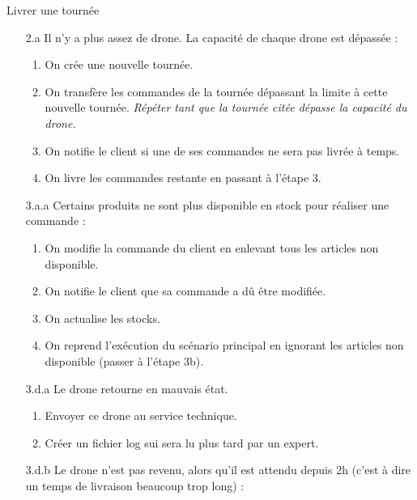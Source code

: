\begin{UseCase}{Livrer une tournée}
\begin{UseCaseExtension}
    \begin{enumerate}
        \item[2.a] Il n'y a plus assez de drone. La capacité de chaque drone
            est dépassée :
            \begin{enumerate}
                \item On crée une nouvelle tournée.
                \item On transfère les commandes de la tournée dépassant la
                    limite à cette nouvelle tournée. \textit{Répéter tant que
                        la tournée citée dépasse la capacité du drone.}
                \item On notifie le client si une de ses commandes ne sera pas
                    livrée à temps.
                \item On livre les commandes restante en passant à l'étape 3.
            \end{enumerate}
        \item[3.a.a] Certains produits ne sont plus disponible en stock pour
            réaliser une commande :
            \begin{enumerate}
                \item On modifie la commande du client en enlevant tous les
                    articles non disponible.
                \item On notifie le client que sa commande a dû être modifiée.
                \item On actualise les stocks.
                \item On reprend l'exécution du scénario principal en ignorant
                    les articles non disponible (passer à l'étape 3b).
            \end{enumerate}
        \item[3.d.a] Le drone retourne en mauvais état.
            \begin{enumerate}
                \item Envoyer ce drone au service technique.
                \item Créer un fichier log sui sera lu plus tard par un expert.
            \end{enumerate}
        \item[3.d.b] Le drone n'est pas revenu, alors qu'il est attendu depuis
            2h (c'est à dire un temps de livraison beaucoup trop long) :
            \begin{enumerate}

\end{enumerate}
\end{enumerate}
\end{UseCaseExtension}
\end{UseCase}
